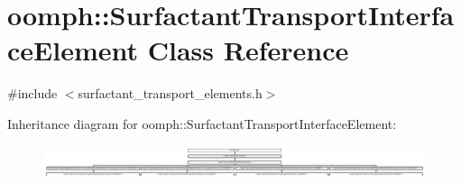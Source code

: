 \hypertarget{classoomph_1_1SurfactantTransportInterfaceElement}{}\section{oomph\+:\+:Surfactant\+Transport\+Interface\+Element Class Reference}
\label{classoomph_1_1SurfactantTransportInterfaceElement}


{\ttfamily \#include $<$surfactant\+\_\+transport\+\_\+elements.\+h$>$}

Inheritance diagram for oomph\+:\+:Surfactant\+Transport\+Interface\+Element\+:\begin{figure}[H]
\begin{center}
\leavevmode
\includegraphics[height=0.992908cm]{classoomph_1_1SurfactantTransportInterfaceElement}
\end{center}
\end{figure}
